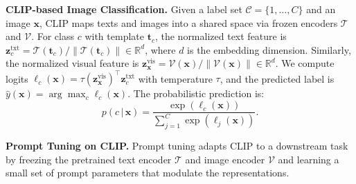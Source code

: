 \documentclass{article}
\theoremstyle{plain}
\theoremstyle{definition}
\theoremstyle{remark}
\begin{document}
	\textbf{CLIP-based Image Classification.} Given a label set $\mathcal{C}=\{1,\dots,C\}$ and an image $\mathbf{x}$, CLIP maps texts and images into a shared space via frozen encoders $\mathcal{T}$ and $\mathcal{V}$. For class $c$ with template $\mathbf{t}_c$, the normalized text feature is $\mathbf{z}^{\mathrm{txt}}_{c}=\mathcal{T}(\mathbf{t}_c)/\|\mathcal{T}(\mathbf{t}_c)\|\in\mathbb{R}^{d}$, where $d$ is the embedding dimension. Similarly, the normalized visual feature is $\mathbf{z}^{\mathrm{vis}}_{\mathbf{x}}=\mathcal{V}(\mathbf{x})/\|\mathcal{V}(\mathbf{x})\|\in\mathbb{R}^{d}$. We compute logits $\ell_c(\mathbf{x})=\tau (\mathbf{z}^{\mathrm{vis}}_{\mathbf{x}})^{\top} \mathbf{z}^{\mathrm{txt}}_{c}$ with temperature $\tau$, and the predicted label is $\hat{y}(\mathbf{x})=\arg\max_{c} \ell_c(\mathbf{x})$. The probabilistic prediction is:
	\begin{equation}
		p(c\,|\,\mathbf{x})=\frac{\exp(\ell_c(\mathbf{x}))}{\sum_{j=1}^{C}\exp(\ell_j(\mathbf{x}))}.
	\end{equation}
	
	\textbf{Prompt Tuning on CLIP.} Prompt tuning adapts CLIP to a downstream task by freezing the pretrained text encoder $\mathcal{T}$ and image encoder $\mathcal{V}$ and learning a small set of prompt parameters that modulate the representations.
	
\end{document}
